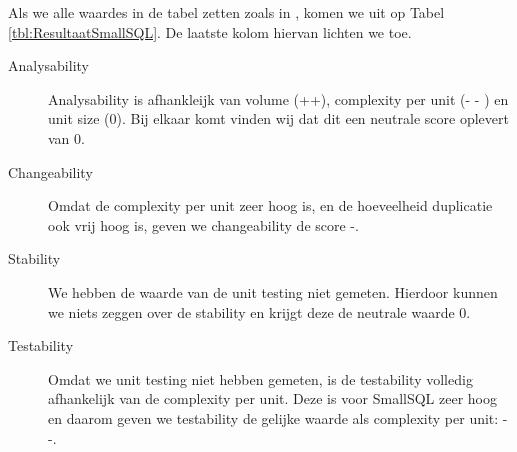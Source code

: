 \documentclass[a4paper]{article}
\begin{document}
Als we alle waardes in de tabel zetten zoals in \cite{A}, komen we uit op Tabel \ref{tbl:ResultaatSmallSQL}. De laatste kolom hiervan lichten we toe.
\begin{description}
\item[Analysability] Analysability is afhankleijk van volume (++), complexity per unit (- - ) en unit size (0). Bij elkaar komt vinden wij dat dit een neutrale score oplevert van 0.
\item[Changeability] Omdat de complexity per unit zeer hoog is, en de hoeveelheid duplicatie ook vrij hoog is, geven we changeability de score -.
\item[Stability] We hebben de waarde van de unit testing niet gemeten. Hierdoor kunnen we niets zeggen over de stability en krijgt deze de neutrale waarde 0.
\item[Testability] Omdat we unit testing niet hebben gemeten, is de testability volledig afhankelijk van de complexity per unit. Deze is voor SmallSQL zeer hoog en daarom geven we testability de gelijke waarde als complexity per unit: - -.
\end{description}
\end{document}
